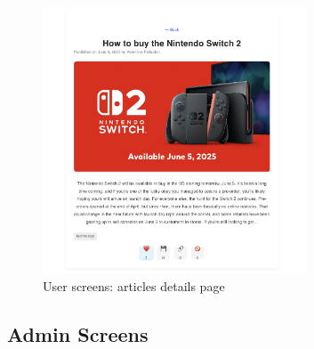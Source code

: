 \begin{figure}[!h]
    \centering
    \includegraphics[width=0.7\textwidth]{chapters/chapter_03/page/user/article-details-page}
    \caption{User screens: articles details page}
    \label{fig:articles-details-wireframes}
\end{figure}


\subsection{Admin Screens}\label{subsec:admin-screens}

